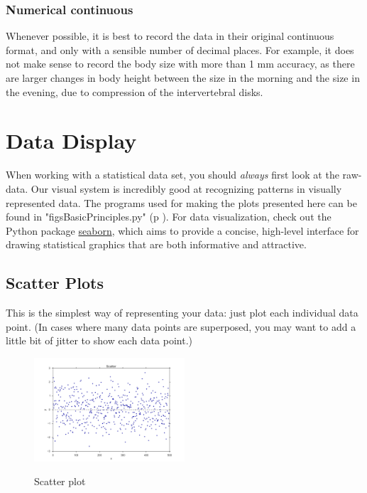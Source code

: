 \subsubsection{Numerical continuous}
Whenever possible, it is best to record the data in their original continuous format, and only with a sensible number of decimal places. For example, it does not make sense to record the body size with more than 1 mm accuracy, as there are larger changes in body height between the size in the morning and the size in the evening, due to compression of the intervertebral disks.

\section{Data Display}

When working with a statistical data set, you should \emph{always} first look at the raw-data. Our visual system is incredibly good at recognizing patterns in visually represented data. The programs used for making the plots presented here can be found in "figsBasicPrinciples.py" (p \pageref{py:BasicPrinciples}). For data visualization, check out the Python package \href{http://www.stanford.edu/~mwaskom/software/seaborn/} {seaborn}, which aims to provide a concise, high-level interface for drawing statistical graphics that are both informative and attractive.

\subsection{Scatter Plots}

This is the simplest way of representing your data: just plot each individual data point. (In cases where many data points are superposed, you may want to add a little bit of jitter to show each data point.)

\begin{figure}
  \centering
  \includegraphics[width=0.5\textwidth]{../Images/scatterPlot.png}\\
  \caption{Scatter plot}
\end{figure}

